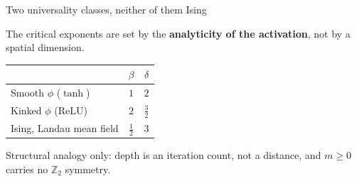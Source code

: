 \documentclass[aspectratio=169,10pt]{beamer}
\newcommand{\relu}{\mathrm{ReLU}}
\newcommand{\scope}[1]{{\footnotesize\color{caveat}#1}}
\begin{document}
\begin{frame}{Two universality classes, neither of them Ising}
  \begingroup
  \small
  \begin{center}
    The critical exponents are set by the \textbf{analyticity of the
    activation}, not by a spatial dimension.
  \end{center}

  \vspace{0.60em}
  \begin{center}
    \renewcommand{\arraystretch}{1.35}
    \setlength{\tabcolsep}{10pt}
    \begin{tabular}{@{}lcc@{}}
      \toprule
      & \(\beta\) & \(\delta\) \\
      \midrule
      Smooth \(\phi\) (\(\tanh\)) & \(1\) & \(2\) \\
      Kinked \(\phi\) (\(\relu\)) & \(2\) & \(\tfrac32\) \\
      \midrule
      Ising, Landau mean field & \(\tfrac12\) & \(3\) \\
      \bottomrule
    \end{tabular}
  \end{center}

  \vspace{0.60em}
  \begin{center}
  \end{center}

  \vspace{0.45em}
  \scope{Structural analogy only: depth is an iteration count, not a
  distance, and \(m\ge0\) carries no \(\mathbb Z_2\) symmetry.}
  \endgroup
\end{frame}
\end{document}
